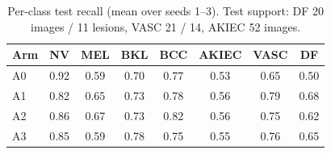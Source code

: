 \begin{table}[t]
\centering
\caption{Per-class test recall (mean over seeds 1--3). Test support: DF 20 images / 11 lesions, VASC 21 / 14, AKIEC 52 images.}
\label{tab:perclass}
\setlength{\tabcolsep}{4pt}
\begin{tabular}{lccccccc}
\toprule
Arm & NV & MEL & BKL & BCC & AKIEC & VASC & DF \\
\midrule
A0 & 0.92 & 0.59 & 0.70 & 0.77 & 0.53 & 0.65 & 0.50 \\
A1 & 0.82 & 0.65 & 0.73 & 0.78 & 0.56 & 0.79 & 0.68 \\
A2 & 0.86 & 0.67 & 0.73 & 0.82 & 0.56 & 0.75 & 0.62 \\
A3 & 0.85 & 0.59 & 0.78 & 0.75 & 0.55 & 0.76 & 0.65 \\
\bottomrule
\end{tabular}
\end{table}
